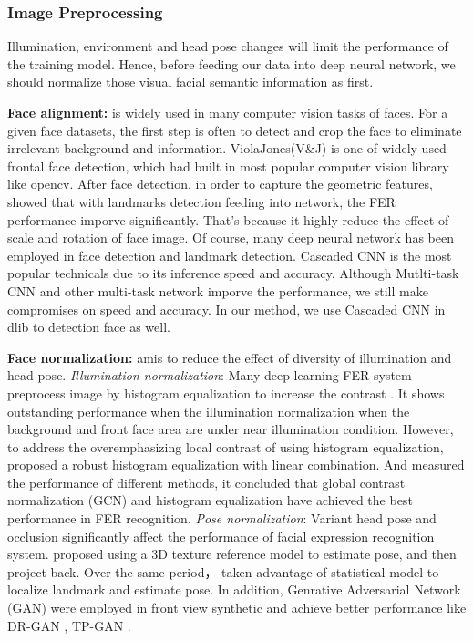 \subsubsection{Image Preprocessing}
Illumination, environment and head pose changes will limit the performance of the training model. Hence, before feeding our data into deep neural network, we should normalize those visual facial semantic information as first. 

\textbf{Face alignment:} is widely used in many computer vision tasks of faces. For a given face datasets, the first step is often to detect and crop the face to eliminate irrelevant background and information.  ViolaJones(V\&J) \citep{violaRapidObjectDetection2001} is one of widely used frontal face detection, which had built in most popular computer vision library like opencv. After face detection, in order to capture the geometric features, \citeauthor{mollahosseiniGoingDeeperFacial2016} showed that with landmarks detection feeding into network, the FER performance imporve significantly. That's because it highly reduce the effect of scale and rotation of face image. Of course, many deep neural network has been employed in face detection and landmark detection. Cascaded CNN \citep{sunDeepConvolutionalNetwork2013} is the most popular technicals due to its inference speed and accuracy. Although Mutlti-task CNN \citep{zhangJointFaceDetection2016} and other multi-task network imporve the performance, we still make compromises on speed and accuracy. In our method, we use Cascaded CNN in dlib to detection face as well.

\textbf{Face normalization:} amis to reduce the effect of diversity of illumination and head pose. \textit{Illumination normalization}: Many deep learning FER system preprocess image by histogram equalization to increase the contrast \citep*{yu2015image,ebrahimi2015recurrent,pitaloka2017enhancing,10.1145/2993148.2997627}. It shows outstanding performance when the illumination normalization when the background and front face area are under near illumination condition. However, to address the overemphasizing local contrast of using histogram equalization, \citeauthor{kuo2018compact} proposed a robust histogram equalization with linear combination. And \citeauthor{pitaloka2017enhancing} measured the performance of different methods, it concluded that global contrast normalization (GCN) and histogram equalization have achieved the best performance in FER recognition. \textit{Pose normalization}: Variant head pose and occlusion significantly affect the performance of facial expression recognition system. \citeauthor{Hassner_2015} proposed using a 3D texture reference model to estimate pose, and then project back. Over the same period， \citeauthor{7410798} taken advantage of statistical model to localize landmark and estimate pose. In addition, Genrative Adversarial Network (GAN) were employed in front view synthetic and achieve better performance like DR-GAN \citep{tran2017disentangled}, TP-GAN \citep{yin2017towards}.

